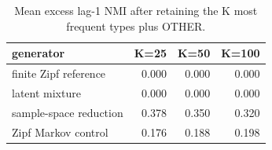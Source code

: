 \begin{table}

\caption{\label{tab:nmi-sensitivity-table}Mean excess lag-1 NMI after retaining the K most frequent types plus OTHER.}
\centering
\begin{tabular}[t]{lrrr}
\toprule
generator & K=25 & K=50 & K=100\\
\midrule
finite Zipf reference & 0.000 & 0.000 & 0.000\\
latent mixture & 0.000 & 0.000 & 0.000\\
sample-space reduction & 0.378 & 0.350 & 0.320\\
Zipf Markov control & 0.176 & 0.188 & 0.198\\
\bottomrule
\end{tabular}
\end{table}
